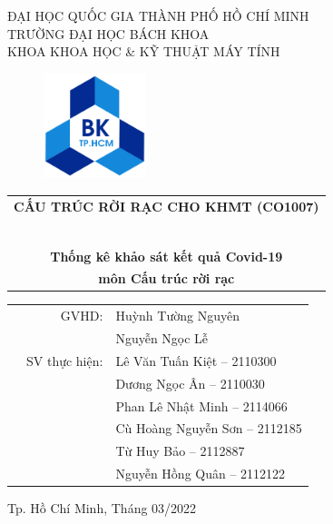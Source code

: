 \documentclass[a4paper]{article}
\theoremstyle{definition}
\begin{document}
	\begin{titlepage}
		\begin{center}
			ĐẠI HỌC QUỐC GIA THÀNH PHỐ HỒ CHÍ MINH \\
			TRƯỜNG ĐẠI HỌC BÁCH KHOA \\
			KHOA KHOA HỌC \& KỸ THUẬT MÁY TÍNH
		\end{center}
		\vspace{1cm}
		\begin{figure}[h]
			\centering
			\includegraphics[width=3cm]{images/hcmut.png}
		\end{figure}	
		\begin{center}
			\begin{tabular}{c}
				\multicolumn{1}{l}{\textbf{{\Large CẤU TRÚC RỜI RẠC CHO KHMT (CO1007)}}}\\
				~~\\
				\hline
				\\
				\textbf{\large Thống kê khảo sát kết quả Covid-19}\\
				\textbf{\large môn Cấu trúc rời rạc}
				\\
				\hline
			\end{tabular}
		\end{center}
		\begin{table}[h]
			\centering
			\begin{tabular}{rrl}
				\hspace{2 cm} & GVHD: & Huỳnh Tường Nguyên\\
				\hspace{2 cm} &  & Nguyễn Ngọc Lễ\\
				
				& SV thực hiện: & Lê Văn Tuấn Kiệt -- 2110300 \\
				& & Dương Ngọc Ân -- 2110030 \\
				& & Phan Lê Nhật Minh -- 2114066 \\
				& & Cù Hoàng Nguyễn Sơn -- 2112185 \\
				& & Từ Huy Bảo -- 2112887 \\
				& & Nguyễn Hồng Quân -- 2112122 \\
			\end{tabular}
		\end{table}
		\vspace{1.5cm}
		\begin{center}
			{\footnotesize Tp. Hồ Chí Minh, Tháng 03/2022}
		\end{center}
	\end{titlepage}
	\newpage
	\tableofcontents
	\newpage
\end{document}
